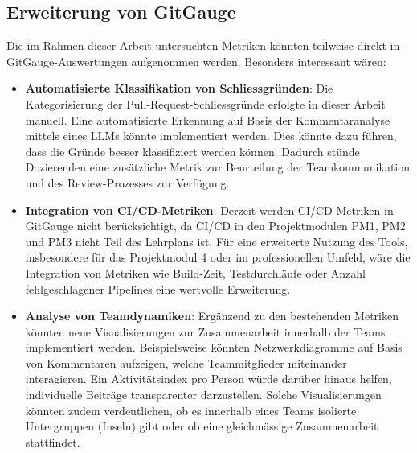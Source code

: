 \subsection{Erweiterung von GitGauge}
Die im Rahmen dieser Arbeit untersuchten Metriken könnten teilweise direkt in GitGauge-Auswertungen aufgenommen werden. Besonders interessant wären:
\begin{itemize}
\item \textbf{Automatisierte Klassifikation von Schliessgründen}: Die Kategorisierung der Pull-Request-Schliessgründe erfolgte in dieser Arbeit manuell. Eine automatisierte Erkennung auf Basis der Kommentaranalyse mittels eines LLMs könnte implementiert werden. Dies könnte dazu führen, dass die Gründe besser klassifiziert werden können. Dadurch stünde Dozierenden eine zusätzliche Metrik zur Beurteilung der Teamkommunikation und des Review-Prozesses zur Verfügung.
\item \textbf{Integration von CI/CD-Metriken}: Derzeit werden CI/CD-Metriken in GitGauge nicht berücksichtigt, da CI/CD in den Projektmodulen PM1, PM2 und PM3 nicht Teil des Lehrplans ist. Für eine erweiterte Nutzung des Tools, insbesondere für das Projektmodul 4 oder im professionellen Umfeld, wäre die Integration von Metriken wie Build-Zeit, Testdurchläufe oder Anzahl fehlgeschlagener Pipelines eine wertvolle Erweiterung.
\item \textbf{Analyse von Teamdynamiken}: Ergänzend zu den bestehenden Metriken \linebreak könnten neue Visualisierungen zur Zusammenarbeit innerhalb der Teams implementiert werden. Beispielsweise könnten Netzwerkdiagramme auf Basis von Kommentaren aufzeigen, welche Teammitglieder miteinander interagieren. Ein Aktivitätsindex pro Person würde darüber hinaus helfen, individuelle Beiträge transparenter darzustellen. Solche Visualisierungen könnten zudem verdeutlichen, ob es innerhalb eines Teams isolierte Untergruppen (Inseln) gibt oder ob eine gleichmässige Zusammenarbeit stattfindet.
\end{itemize}


